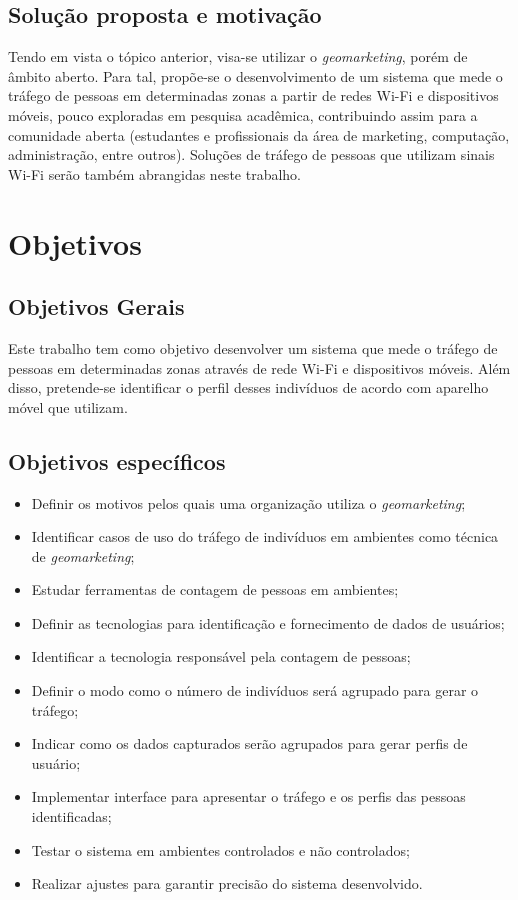 \subsection{Solução proposta e motivação}
Tendo em vista o tópico anterior, visa-se utilizar o \emph{geomarketing}, porém de
âmbito aberto. Para tal, propõe-se o desenvolvimento de um sistema que mede o
tráfego de pessoas em determinadas zonas a partir de redes Wi-Fi e dispositivos móveis, pouco exploradas em
pesquisa acadêmica, contribuindo assim para a comunidade aberta (estudantes e profissionais da área de
marketing, computação, administração, entre outros). Soluções de tráfego de pessoas que utilizam sinais Wi-Fi
serão também abrangidas neste trabalho.

\section{Objetivos}
\label{objetivos}

\subsection{Objetivos Gerais}
Este trabalho tem como objetivo desenvolver um sistema que mede o tráfego de
pessoas em determinadas zonas através de rede Wi-Fi e dispositivos móveis. Além
disso, pretende-se identificar o perfil desses indivíduos de acordo com aparelho
móvel que utilizam.

\subsection{Objetivos específicos}
\begin{itemize}
  \item Definir os motivos pelos quais uma organização utiliza o \emph{geomarketing};
  \item Identificar casos de uso do tráfego de indivíduos em ambientes como técnica
  de \emph{geomarketing};
  \item Estudar ferramentas de contagem de pessoas em ambientes;
  \item Definir as tecnologias para identificação e fornecimento de dados de usuários;
  \item Identificar a tecnologia responsável pela contagem de pessoas;
  \item Definir o modo como o número de indivíduos será agrupado para gerar o tráfego;
  \item Indicar como os dados capturados serão agrupados para gerar perfis de usuário;
  \item Implementar interface para apresentar o tráfego e os perfis das pessoas identificadas;
  \item Testar o sistema em ambientes controlados e não controlados;
  \item Realizar ajustes para garantir precisão do sistema desenvolvido.
\end{itemize}


